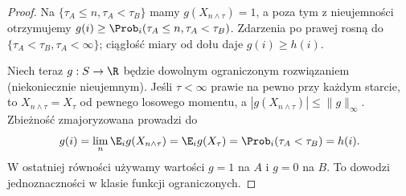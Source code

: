 \begin{proof}
Na $\{\tau_A\leq n,\tau_A<\tau_B\}$ mamy
$g(X_{n\wedge\tau})=1$, a poza tym z
nieujemności otrzymujemy
$g(i)\geq\Prob_i(\tau_A\leq n,\tau_A<\tau_B)$.
Zdarzenia po prawej rosną do
$\{\tau_A<\tau_B,\tau_A<\infty\}$;
ciągłość miary od dołu daje $g(i)\geq h(i)$.

Niech teraz $g:S\to\R$ będzie dowolnym ograniczonym
rozwiązaniem (niekoniecznie nieujemnym). Jeśli $\tau<\infty$
prawie na pewno przy każdym starcie, to
$X_{n\wedge\tau}=X_\tau$ od pewnego losowego
momentu, a $|g(X_{n\wedge\tau})|\leq\|g\|_\infty$.
Zbieżność zmajoryzowana prowadzi do
\[
 g(i)=\lim_n\E_i g(X_{n\wedge\tau})
 =\E_i g(X_\tau)
 =\Prob_i(\tau_A<\tau_B)=h(i).
\]
W ostatniej równości używamy wartości $g=1$
na $A$ i $g=0$ na $B$. To dowodzi jednoznaczności
w klasie funkcji ograniczonych. 
\end{proof}

